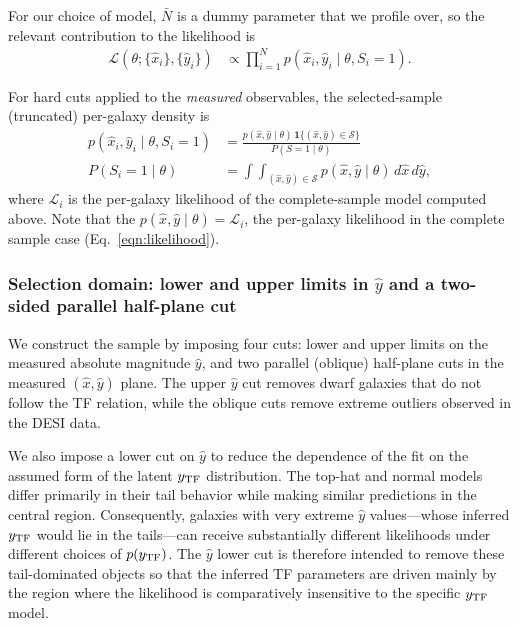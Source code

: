 For our choice of model, $\bar N$ is a dummy parameter that we profile over, so the relevant contribution to the likelihood is
\begin{align}
\mathcal L(\theta; \{\hat x_i\},\{\hat y_i\})
& \propto
\prod_{i=1}^{N}
p(\hat x_i,\hat y_i \mid \theta, S_i=1).
\end{align}

For hard cuts applied to the \emph{measured} observables, the selected-sample (truncated) per-galaxy density is
\begin{align}
p(\hat x_i,\hat y_i \mid \theta, S_i=1)
&
=
\frac{p(\hat x,\hat y\mid\theta)\,\mathbf 1\{(\hat x,\hat y)\in\mathcal S\}}
{P(S=1\mid\theta)}
\\
P(S_i=1\mid \theta)
&=
\int\!\!\!\int_{(\hat x,\hat y)\in\mathcal S}
p(\hat x,\hat y \mid \theta)\, d\hat x\, d\hat y,
\end{align}
where $\mathcal{L}_i$ is the per-galaxy likelihood of the complete-sample model computed above.
Note that the $p(\hat x,\hat y\mid\theta) = \mathcal L_i$, the per-galaxy likelihood
in the complete sample case (Eq.~\ref{eqn:likelihood}).

\subsubsection{Selection domain: lower and upper limits in $\hat y$ and a two-sided parallel half-plane cut}

We construct the sample by imposing four cuts: lower and upper limits on the measured absolute magnitude $\hat y$,
and two parallel (oblique) half-plane cuts in the measured $(\hat x,\hat y)$ plane. The upper $\hat y$ cut removes dwarf galaxies
that do not follow the TF relation, while the oblique cuts remove extreme outliers observed in the DESI data.

We also impose a lower cut on $\hat y$ to reduce the dependence of the fit on the assumed form of the latent $y_{\rm TF}$ distribution.
The top-hat and normal models differ primarily in their tail behavior while making similar predictions in the central region.
Consequently, galaxies with very extreme $\hat y$ values---whose inferred $y_{\rm TF}$ would lie in the tails---can receive substantially
different likelihoods under different choices of $p(y_{\rm TF})$. The $\hat y$ lower cut is therefore intended to remove these tail-dominated
objects so that the inferred TF parameters are driven mainly by the region where the likelihood is comparatively insensitive to the specific
$y_{\rm TF}$ model.


